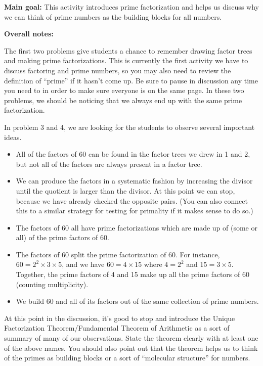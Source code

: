 \documentclass[noauthor, nooutcomes]{ximera}
\begin{document}
\newpage
\begin{instructorNotes}

{\bf Main goal:} This activity introduces prime factorization and helps us discuss why we can think of prime numbers as the building blocks for all numbers.

{\bf Overall notes:} 

The first two problems give students a chance to remember drawing factor trees and making prime factorizations. This is currently the first activity we have to discuss factoring and prime numbers, so you may also need to review the definition of ``prime'' if it hasn't come up. Be sure to pause in discussion any time you need to in order to make sure everyone is on the same page. In these two problems, we should be noticing that we always end up with the same prime factorization.

In problem 3 and 4, we are looking for the students to observe several important ideas.
\begin{itemize}
	\item All of the factors of 60 can be found in the factor trees we drew in 1 and 2, but not all of the factors are always present in a factor tree.
	\item We can produce the factors in a systematic fashion by increasing the divisor until the quotient is larger than the divisor. At this point we can stop, because we have already checked the opposite pairs. (You can also connect this to a similar strategy for testing for primality if it makes sense to do so.)
	\item The factors of 60 all have prime factorizations which are made up of (some or all) of the prime factors of 60.
	\item The factors of 60 split the prime factorization of 60. For instance, $60 = 2^2 \times 3 \times 5$, and we have $60 = 4 \times 15$ where $4 = 2^2$ and $15 = 3 \times 5$. Together, the prime factors of 4 and 15 make up all the prime factors of 60 (counting multiplicity). 
	\item We build 60 and all of its factors out of the same collection of prime numbers.
\end{itemize}
At this point in the discussion, it's good to stop and introduce the Unique Factorization Theorem/Fundamental Theorem of Arithmetic as a sort of summary of many of our observations. State the theorem clearly with at least one of the above names. You should also point out that the theorem helps us to think of the primes as building blocks or a sort of ``molecular structure'' for numbers.


\end{instructorNotes}
\end{document}
